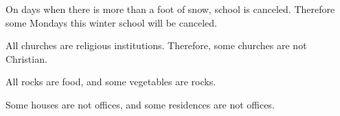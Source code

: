 {\begin{exercises}
\item On days when there is more than a foot of snow, school is canceled. Therefore some Mondays this winter school will be canceled. 




\item All churches are religious institutions. Therefore, some churches are not Christian.

\item All rocks are food, and some vegetables are rocks.



\item Some houses are not offices, and some residences are not offices.
%


\end{exercises}}

